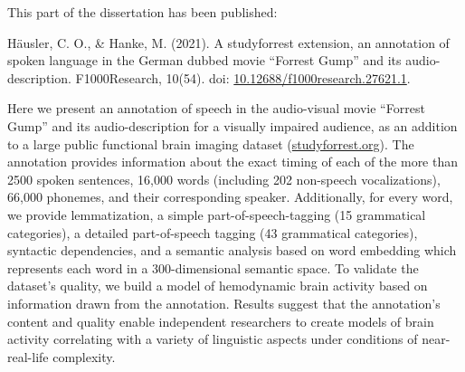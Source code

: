 This part of the dissertation has been published:

\bigbreak

\noindent
%
Häusler, C. O.,
%
\& Hanke, M.
%
(2021).
%
A studyforrest extension, an annotation of spoken language in the German dubbed
movie ``Forrest Gump'' and its audio-description.
%
F1000Research, 10(54).
%
doi: \href{https://doi.org/10.12688/f1000research.27621.1}
{\url{10.12688/f1000research.27621.1}}.


\begin{chapterabstract}
%
Here we present an annotation of speech in the audio-visual movie
``Forrest Gump'' and its audio-description for a visually impaired audience,
as an addition to a large public functional brain imaging dataset
(\href{www.studyforrest.org}{\url{studyforrest.org}}).
The annotation provides information about the exact timing of each of the more
than 2500 spoken sentences, 16,000 words (including 202 non-speech
vocalizations), 66,000 phonemes, and their corresponding speaker.
Additionally, for every word, we provide lemmatization, a simple
part-of-speech-tagging (15 grammatical categories), a detailed part-of-speech
tagging (43 grammatical categories), syntactic dependencies, and a semantic
analysis based on word embedding which represents each word in a
300-dimensional semantic space.
To validate the dataset's quality, we build a model of hemodynamic brain
activity based on information drawn from the annotation.
Results suggest that the annotation's content and quality enable independent
researchers to create models of brain activity correlating with a
variety of linguistic aspects under conditions of near-real-life complexity.
%
\end{chapterabstract}
